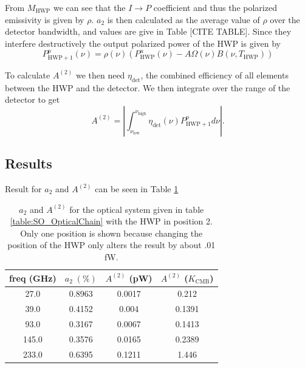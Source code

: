 \documentclass{article}
\theoremstyle{remark}
\newcommand{\tab}{\hspace*{2em}}
\renewcommand{\t}[1]{\text{#1}}
\newcommand{\A}[1]{A^{(#1)}}
\newcommand{\ip}{$I\rightarrow P$ }
\newcommand{\abs}[1]{\left|#1\right|}%
\begin{document}
\tab From $M_\t{HWP}$ we can see that the \ip coefficient and thus the polarized emissivity is given by $\rho$. 
$a_2$ is then calculated as the average value of $\rho$ over the detector bandwidth, and values are give in Table [CITE TABLE].
Since they interfere destructively the output polarized power of the HWP is given by
\[
P^p_{\t{HWP} + 1}(\nu)= \rho(\nu) \left(P^u_\t{HWP}(\nu) - A \Omega(\nu) B(\nu, T_\t{HWP}) \right) 	
\]

\tab To calculate $\A2$ we then need $\eta_\t{det}$, the combined efficiency of all elements between the HWP and the detector.
We then integrate over the range of the detector to get
\[
\A2 = \abs{ \int_{\nu_\t{low}}^{\nu_\t{high}} \eta_\t{det}(\nu) P^p_{\t{HWP} + 1} d\nu }.
\]




\subsection*{Results}

Result for $a_2$ and $\A2$ can be seen in Table \ref{table:SO_a2}




\begin{table}
\centering
\begin{tabular}{ |c|c|c|c|} 
	\hline
	freq (GHz) &  $a_2\; (\%)$ & $\A2$ (pW)  & $\A2$ ($K_\t{CMB}$) \\ \hline
	27.0  & 0.8963 & 0.0017 & 0.212 \\ 
	39.0  & 0.4152 & 0.004  & 0.1391\\ 
	93.0  & 0.3167 & 0.0067 & 0.1413\\ 
	145.0 & 0.3576 & 0.0165 & 0.2389\\ 
	233.0 & 0.6395 & 0.1211 & 1.446 \\ 
	\hline	
\end{tabular}



\caption{ $a_2$ and $\A2$ for the optical system given in table \ref{table:SO_OpticalChain} with the HWP in position 2. 
Only one position is shown because changing the position of the HWP only alters the result by about .01 fW. 
}
\label{table:SO_a2}
\end{table}
 
\printbibliography
\end{document}
